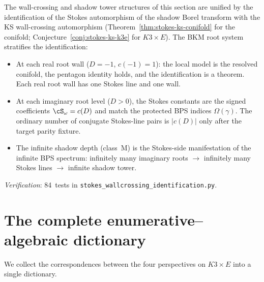 \begin{remark}[Stokes automorphism = KS wall-crossing for \texorpdfstring{$K3 \times E$}{K3 x E}]
\label{rem:k3e-stokes-ks}
The wall-crossing and shadow tower structures of this section are unified by the identification of the Stokes automorphism of the shadow Borel transform with the KS wall-crossing automorphism (Theorem~\ref{thm:stokes-ks-conifold} for the conifold; Conjecture~\ref{conj:stokes-ks-k3e} for $K3 \times E$). The BKM root system stratifies the identification:
\begin{itemize}
\item At each real root wall ($D = -1$, $c(-1) = 1$): the local model is the resolved conifold, the pentagon identity holds, and the identification is a theorem. Each real root wall has one Stokes line and one wall.
\item At each imaginary root level ($D > 0$), the Stokes constants are the signed coefficients $\cS_\omega = c(D)$ and match the protected BPS indices $\Omega(\gamma)$. The ordinary number of conjugate Stokes-line pairs is $|c(D)|$ only after the target parity fixture.
\item The infinite shadow depth (class~M) is the Stokes-side manifestation of the infinite BPS spectrum: infinitely many imaginary roots $\to$ infinitely many Stokes lines $\to$ infinite shadow tower.
\end{itemize}
\noindent\textit{Verification}: 84~tests in \texttt{stokes\_wallcrossing\_identification.py}.
\end{remark}


\section{The complete enumerative--algebraic dictionary}
\label{sec:k3e-dictionary}

We collect the correspondences between the four perspectives on $K3 \times E$ into a single dictionary.

